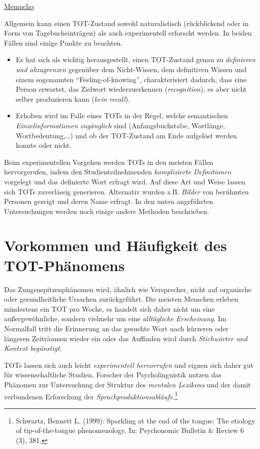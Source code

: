 \documentclass[
  letterpaper,
]{scrbook}
\begin{document}
\href{https://memucho.de/Tip-of-the-Tongue-Phaenomen/983\#}{Memucho}:

Allgemein kann einen TOT-Zustand sowohl naturalistisch (rückblickend
oder in Form von Tagebucheinträgen) als auch experimentell erforscht
werden. In beiden Fällen sind einige Punkte zu beachten.

\begin{itemize}
\item
  Es hat sich als wichtig herausgestellt, einen TOT-Zustand genau zu
  \emph{definieren und abzugrenzen} gegenüber dem Nicht-Wissen, dem
  definitiven Wissen und einem sogenannten ``Feeling-of-knowing'',
  charakterisiert dadurch, dass eine Person erwartet, das Zielwort
  wiederzuerkennen (\emph{recognition}), es aber nicht selber
  produzieren kann (\emph{kein recall}).
\item
  Erhoben wird im Falle eines TOTs in der Regel, welche semantischen
  \emph{Einzelinformationen zugänglich} sind (Anfangsbuchstabe,
  Wortlänge, Wortbedeutung,\ldots) und ob der TOT-Zustand am Ende
  aufgelöst werden konnte oder nicht.
\end{itemize}

Beim experimentellen Vorgehen werden TOTs in den meisten Fällen
hervorgerufen, indem den Studienteilnehmenden \emph{komplizierte
Definitionen} vorgelegt und das definierte Wort erfragt wird. Auf diese
Art und Weise lassen sich TOTs zuverlässig generieren. Alternativ wurden
z.B. \emph{Bilder} von berühmten Personen gezeigt und deren Name
erfragt. In den unten angeführten Untersuchungen werden noch einige
andere Methoden beschrieben.

\hypertarget{vorkommen-und-huxe4ufigkeit-des-tot-phuxe4nomens}{%
\section{Vorkommen und Häufigkeit des
TOT-Phänomens}\label{vorkommen-und-huxe4ufigkeit-des-tot-phuxe4nomens}}

Das Zungenspitzenphänomen wird, ähnlich wie Versprecher, nicht auf
organische oder gesundheitliche Ursachen zurückgeführt. Die meisten
Menschen erleben mindestens ein TOT pro Woche, es handelt sich daher
nicht um eine außergewöhnliche, sondern vielmehr um eine
\emph{alltägliche Erscheinung}. Im Normalfall tritt die Erinnerung an
das gesuchte Wort nach kürzeren oder längeren Zeiträumen wieder ein oder
das Auffinden wird durch \emph{Stichwörter und Kontext begünstigt}.

TOTs lassen sich auch leicht \emph{experimentell hervorrufen} und eignen
sich daher gut für wissenschaftliche Studien. Forscher der
Psycholinguistik nutzen das Phänomen zur Untersuchung der Struktur des
\emph{mentalen Lexikons} und der damit verbundenen Erforschung der
\emph{Sprachproduktionsabläufe}.\footnote{Schwartz, Bennett L. (1999):
  Sparkling at the end of the tongue: The etiology of tip-of-the-tongue
  phenomenology. In: Psychonomic Bulletin \& Review 6 (3), 381.}
\end{document}

